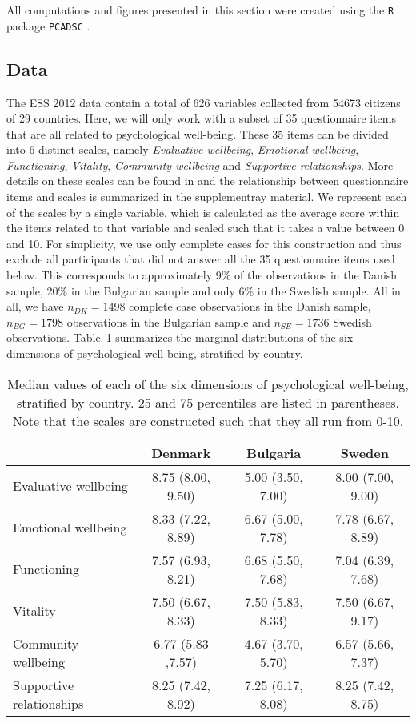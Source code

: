 \documentclass[a4paper,14pt]{article}
\newcommand{\R}[1]{\texttt{#1}}
\begin{document}
All computations and figures presented in this section were created using the \R{R} package \R{PCADSC} \cite{PCADSC}.


\subsection*{Data}


The ESS 2012 data contain a total of 626 variables collected from 54673 citizens of 29 countries. Here, we will only work with a subset of 35 questionnaire items that are all related to psychological well-being. These 35 items can be divided into 6 distinct scales, namely \textit{Evaluative wellbeing}, \textit{Emotional wellbeing}, \textit{Functioning}, \textit{Vitality}, \textit{Community wellbeing} and \textit{Supportive relationships}. More details on these scales can be found in \cite{ESStopline5} and the relationship between questionnaire items and scales is summarized in the supplementray material. We represent each of the scales by a single variable, which is calculated as the average score within the items related to that variable and scaled such that it takes a value between 0 and 10. For simplicity, we use only complete cases for this construction and thus exclude all participants that did not answer all the 35 questionnaire items used below. This corresponds to approximately 9\% of the observations in the Danish sample, 20\% in the Bulgarian sample and only 6\% in the Swedish sample. All in all, we have $n_{DK} = 1498$ complete case observations in the Danish sample, $n_{BG} = 1798$ observations in the Bulgarian sample and $n_{SE} = 1736$ Swedish observations. Table~\ref{tableDistr} summarizes the marginal distributions of the six dimensions of psychological well-being, stratified by country.

\begin{table}[!ht]
\centering
\begin{tabular}{lccc}
\hline
  & Denmark & Bulgaria & Sweden \\
\hline
Evaluative wellbeing    & 8.75 (8.00, 9.50) & 5.00 (3.50, 7.00) & 8.00 (7.00, 9.00) \\
Emotional wellbeing     & 8.33 (7.22, 8.89) & 6.67 (5.00, 7.78) & 7.78 (6.67, 8.89) \\
Functioning             & 7.57 (6.93, 8.21) & 6.68 (5.50, 7.68) & 7.04 (6.39, 7.68) \\
Vitality                & 7.50 (6.67, 8.33) & 7.50 (5.83, 8.33) & 7.50 (6.67, 9.17) \\
Community wellbeing     & 6.77 (5.83 ,7.57) & 4.67 (3.70, 5.70) & 6.57 (5.66, 7.37) \\
Supportive relationships& 8.25 (7.42, 8.92) & 7.25 (6.17, 8.08) & 8.25 (7.42, 8.75) \\
\hline
\end{tabular}
\caption{Median values of each of the six dimensions of psychological well-being, stratified by country. 25 and 75 percentiles are listed in parentheses. Note that the scales are constructed such that they all run from 0-10.}
\label{tableDistr}
\end{table}
\end{document}

